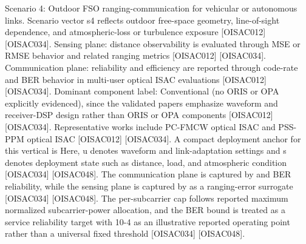 {}Scenario 4: Outdoor FSO ranging-communication for vehicular or autonomous links.\markdownRendererHardLineBreak
{}Scenario vector s4 reflects outdoor free-space geometry, line-of-sight dependence, and atmospheric-loss or turbulence exposure [O\markdownRendererUnderscore{}ISAC\markdownRendererUnderscore{}012] [O\markdownRendererUnderscore{}ISAC\markdownRendererUnderscore{}034]. Sensing plane: distance observability is evaluated through MSE or RMSE behavior and related ranging metrics [O\markdownRendererUnderscore{}ISAC\markdownRendererUnderscore{}012] [O\markdownRendererUnderscore{}ISAC\markdownRendererUnderscore{}034]. Communication plane: reliability and efficiency are reported through code-rate and BER behavior in multi-user optical ISAC evaluations [O\markdownRendererUnderscore{}ISAC\markdownRendererUnderscore{}012] [O\markdownRendererUnderscore{}ISAC\markdownRendererUnderscore{}034]. Dominant component label: Conventional (no ORIS or OPA explicitly evidenced), since the validated papers emphasize waveform and receiver-DSP design rather than ORIS or OPA components [O\markdownRendererUnderscore{}ISAC\markdownRendererUnderscore{}012] [O\markdownRendererUnderscore{}ISAC\markdownRendererUnderscore{}034]. Representative works include PC-FMCW optical ISAC and PSS-PPM optical ISAC [O\markdownRendererUnderscore{}ISAC\markdownRendererUnderscore{}012] [O\markdownRendererUnderscore{}ISAC\markdownRendererUnderscore{}034].\markdownRendererInterblockSeparator
{}
\markdownRendererSectionEnd \markdownRendererSectionBegin
{}\markdownRendererInterblockSeparator
{}A compact deployment anchor for this vertical is\markdownRendererInterblockSeparator
{}\markdownRendererInterblockSeparator
{}\markdownRendererInterblockSeparator
{}\markdownRendererInterblockSeparator
{}Here, u denotes waveform and link-adaptation settings and s denotes deployment state such as distance, load, and atmospheric condition [O\markdownRendererUnderscore{}ISAC\markdownRendererUnderscore{}034] [O\markdownRendererUnderscore{}ISAC\markdownRendererUnderscore{}048]. The communication plane is captured by  and BER reliability, while the sensing plane is captured by  as a ranging-error surrogate [O\markdownRendererUnderscore{}ISAC\markdownRendererUnderscore{}034] [O\markdownRendererUnderscore{}ISAC\markdownRendererUnderscore{}048]. The per-subcarrier cap  follows reported maximum normalized subcarrier-power allocation, and the BER bound is treated as a service reliability target with 10\markdownRendererCircumflex{}-4 as an illustrative reported operating point rather than a universal fixed threshold [O\markdownRendererUnderscore{}ISAC\markdownRendererUnderscore{}034] [O\markdownRendererUnderscore{}ISAC\markdownRendererUnderscore{}048].\markdownRendererParagraphSeparator
